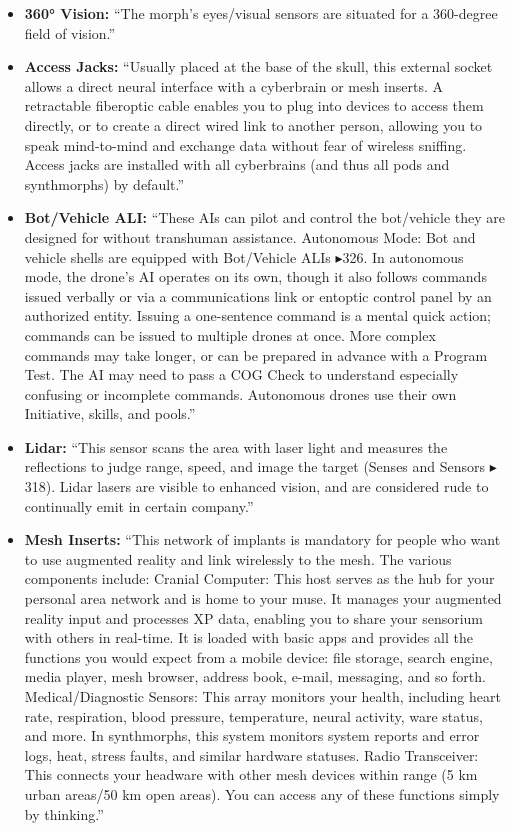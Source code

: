 \begin{itemize}
    \item \textbf{360° Vision:} “The morph’s eyes/visual sensors are situated for a 360-degree field of vision.” \citep[pg. 318]{ep2e_1.1_2019}

    \item \textbf{Access Jacks:} “Usually placed at the base of the skull, this external socket allows a direct neural interface with a cyberbrain or mesh inserts. A retractable fiberoptic cable enables you to plug into devices to access them directly, or to create a direct wired link to another person, allowing you to speak mind-to-mind and exchange data without fear of wireless sniffing. Access jacks are installed with all cyberbrains (and thus all pods and synthmorphs) by default.” \citep[pg. 318]{ep2e_1.1_2019}

    \item \textbf{Bot/Vehicle ALI:} “These AIs can pilot and control the bot/vehicle they are designed for without transhuman assistance. Autonomous Mode: Bot and vehicle shells are equipped with Bot/Vehicle ALIs $\blacktriangleright$326. In autonomous mode, the drone’s AI operates on its own, though it also follows commands issued verbally or via a communications link or entoptic control panel by an authorized entity. Issuing a one-sentence command is a mental quick action; commands can be issued to multiple drones at once. More complex commands may take longer, or can be prepared in advance with a Program Test. The AI may need to pass a COG Check to understand especially confusing or incomplete commands. Autonomous drones use their own Initiative, skills, and pools.” \citep[pg. 326, 346]{ep2e_1.1_2019}

    \item \textbf{Lidar:} “This sensor scans the area with laser light and measures the reflections to judge range, speed, and image the target (Senses and Sensors $\blacktriangleright$318). Lidar lasers are visible to enhanced vision, and are considered rude to continually emit in certain company.” \citep[pg. 318]{ep2e_1.1_2019}

    \item \textbf{Mesh Inserts:} “This network of implants is mandatory for people who want to use augmented reality and link wirelessly to the mesh. The various components include: Cranial Computer: This host serves as the hub for your personal area network and is home to your muse. It manages your augmented reality input and processes XP data, enabling you to share your sensorium with others in real-time. It is loaded with basic apps and provides all the functions you would expect from a mobile device: file storage, search engine, media player, mesh browser, address book, e-mail, messaging, and so forth. Medical/Diagnostic Sensors: This array monitors your health, including heart rate, respiration, blood pressure, temperature, neural activity, ware status, and more. In synthmorphs, this system monitors system reports and error logs, heat, stress faults, and similar hardware statuses. Radio Transceiver: This connects your headware with other mesh devices within range (5 km urban areas/50 km open areas). You can access any of these functions simply by thinking.” \citep[pg. 316]{ep2e_1.1_2019}


\end{itemize}
